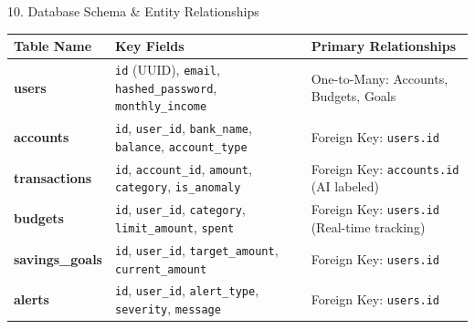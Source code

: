 \documentclass[10pt,aspectratio=169]{beamer}
\begin{document}
\begin{frame}{10. Database Schema \& Entity Relationships}
    \centering
    \begin{tabular}{lll}
        \toprule
        Table Name & Key Fields & Primary Relationships \\
        \midrule
        \textbf{users} & \texttt{id} (UUID), \texttt{email}, \texttt{hashed\_password}, \texttt{monthly\_income} & One-to-Many: Accounts, Budgets, Goals \\
        \textbf{accounts} & \texttt{id}, \texttt{user\_id}, \texttt{bank\_name}, \texttt{balance}, \texttt{account\_type} & Foreign Key: \texttt{users.id} \\
        \textbf{transactions} & \texttt{id}, \texttt{account\_id}, \texttt{amount}, \texttt{category}, \texttt{is\_anomaly} & Foreign Key: \texttt{accounts.id} (AI labeled) \\
        \textbf{budgets} & \texttt{id}, \texttt{user\_id}, \texttt{category}, \texttt{limit\_amount}, \texttt{spent} & Foreign Key: \texttt{users.id} (Real-time tracking) \\
        \textbf{savings\_goals} & \texttt{id}, \texttt{user\_id}, \texttt{target\_amount}, \texttt{current\_amount} & Foreign Key: \texttt{users.id} \\
        \textbf{alerts} & \texttt{id}, \texttt{user\_id}, \texttt{alert\_type}, \texttt{severity}, \texttt{message} & Foreign Key: \texttt{users.id} \\
        \bottomrule
    \end{tabular}
\end{frame}
\end{document}
